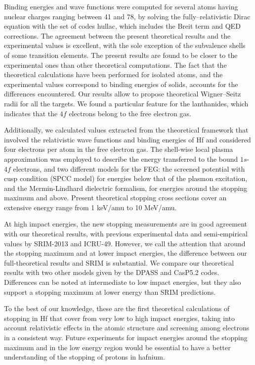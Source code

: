 Binding energies and wave functions were computed for several atoms
having nuclear charges ranging between 41 and 78, by solving the
fully--relativistic Dirac equation with the set of codes {\sc hullac}, 
which includes the Breit term and QED corrections. The agreement between 
the present theoretical results and the experimental values is excellent,
with the sole exception of the subvalence shells of some transition
elements. The present results are found to be closer to the experimental 
ones than other theoretical computations. 
The fact that the theoretical calculations have been performed
for isolated atoms, and
the experimental values correspond to binding energies of solids,
accounts for the differences encountered. 
Our results allow to propose theoretical Wigner--Seitz radii for all 
the targets. We found a particular feature for the lanthanides, which
indicates that the $4f$ electrons belong to the free electron gas.

Additionally, we calculated values extracted from the 
theoretical framework that involved the relativistic wave functions and 
binding energies of Hf and considered four electrons per atom in the 
free electron gas. The shell-wise local plasma approximation was 
employed to describe the energy transferred to the bound $1s$-$4f$ 
electrons, and two different models for the FEG: the screened potential 
with cusp condition (SPCC model) for energies below that of the plasmon 
excitation, and the Mermin-Lindhard dielectric formalism, for energies 
around the stopping maximum and above. Present theoretical stopping 
cross sections cover an extensive energy range from 1 keV/amu to 
10 MeV/amu.


At high impact energies, the new stopping  measurements are in good 
agreement with our theoretical results, with previous experimental data
and semi-empirical values by SRIM-2013 and ICRU-49.  However, we call 
the attention that around the stopping maximum and at lower impact 
energies, the difference between our full-theoretical results and SRIM 
is substantial. We compare our theoretical results with two other models 
given by the DPASS and CasP5.2 codes. Differences can be noted at 
intermediate to low impact energies, but they also support a stopping 
maximum at lower energy than SRIM predictions. 

To the best of our knowledge, these are the first theoretical 
calculations of stopping in Hf that cover from very low to high impact energies, taking into account relativistic effects in the atomic structure and screening among electrons in a consistent 
way. Future experiments for 
impact energies around the stopping maximum and in the low energy region 
would be essential to have a better understanding of the stopping of 
protons in hafnium.

